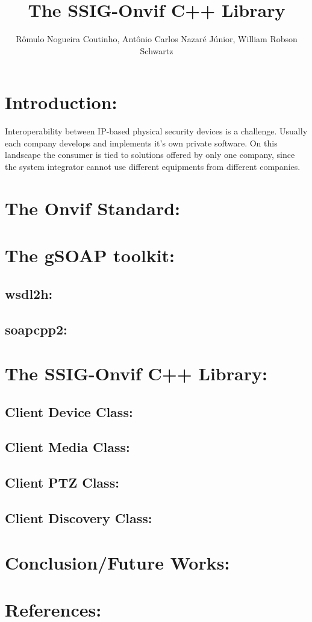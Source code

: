 \documentclass{report}
\title{The SSIG-Onvif C++ Library}
\author{R\^omulo Nogueira Coutinho, Ant\^onio Carlos Nazar\'e J\'unior, William Robson Schwartz}
\begin{document}
  \maketitle
  \newpage
  
  \chapter{Introduction:}
  Interoperability between IP-based physical security devices is a challenge. Usually each company develops and implements it's own private software. On this landscape the consumer is tied to solutions offered by only one company, since the system
  integrator cannot use different equipments from different companies. 
  
  
  \chapter{The Onvif Standard:}
  
  \chapter{The gSOAP toolkit:}
  \section{wsdl2h:}
  \section{soapcpp2:}
  
  \chapter{The SSIG-Onvif C++ Library:}
  \section{Client Device Class:}
  \section{Client Media Class:}
  \section{Client PTZ Class:}
  \section{Client Discovery Class:}
  
  \chapter{Conclusion/Future Works:}
  
  \chapter{References:}
  
\end{document}
